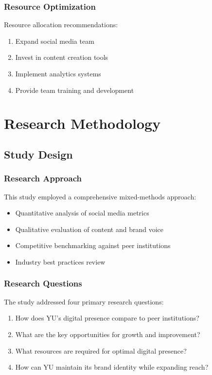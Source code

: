 \documentclass[12pt]{report}
\begin{document}
\subsection{Resource Optimization}
Resource allocation recommendations:
\begin{enumerate}
    \item Expand social media team
    \item Invest in content creation tools
    \item Implement analytics systems
    \item Provide team training and development
\end{enumerate}

\chapter{Research Methodology}

\section{Study Design}
\subsection{Research Approach}
This study employed a comprehensive mixed-methods approach:
\begin{itemize}
    \item Quantitative analysis of social media metrics
    \item Qualitative evaluation of content and brand voice
    \item Competitive benchmarking against peer institutions
    \item Industry best practices review
\end{itemize}

\subsection{Research Questions}
The study addressed four primary research questions:
\begin{enumerate}
    \item How does YU's digital presence compare to peer institutions?
    \item What are the key opportunities for growth and improvement?
    \item What resources are required for optimal digital presence?
    \item How can YU maintain its brand identity while expanding reach?
\end{enumerate}
\end{document}
